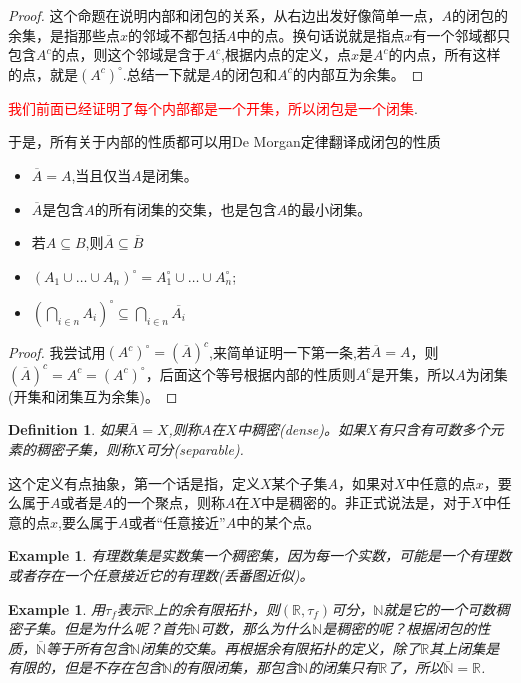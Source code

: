 \documentclass{article}
\newtheorem{example}[theorem]{Example}
\newtheorem{definition}[theorem]{Definition}
\begin{document}
\begin{proof}
这个命题在说明内部和闭包的关系，从右边出发好像简单一点，$A$的闭包的余集，是指那些点$x$的邻域不都包括$A$中的点。换句话说就是指点$x$有一个邻域都只包含$A^c$的点，则这个邻域是含于$A^c$,根据内点的定义，点$x$是$A^c$的内点，所有这样的点，就是$(A^c)^{\circ}$.总结一下就是$A$的闭包和$A^c$的内部互为余集。	
\end{proof}

\textcolor{red}{我们前面已经证明了每个内部都是一个开集，所以闭包是一个闭集}.

于是，所有关于内部的性质都可以用De Morgan定律翻译成闭包的性质

\begin{itemize}
	\item $\overline{A} = A$,当且仅当$A$是闭集。
	\item $\overline{A}$是包含$A$的所有闭集的交集，也是包含$A$的最小闭集。
	\item 若$A \subseteq B$,则$\overline{A} \subseteq \overline{B}$
	\item $(A_1 \cup \ldots \cup A_n)^{\circ}=A_1^{\circ} \cup \ldots \cup A_n^{\circ}$;
	\item ${\left(\bigcap\limits_{i \in n} A_i\right)}^{\circ} \subseteq \bigcap\limits_{i \in n} \overline{A_i}$
\end{itemize}

\begin{proof}
我尝试用$(A^{c})^{\circ}=(\overline{A})^c$,来简单证明一下第一条,若$\overline{A}=A$，则$(\overline{A})^c = A^c=(A^{c})^{\circ}$，后面这个等号根据内部的性质则$A^c$是开集，所以$A$为闭集(开集和闭集互为余集)。
\end{proof}


\begin{definition}
如果$\overline{A}=X$,则称$A$在$X$中稠密(dense)。如果$X$有只含有可数多个元素的稠密子集，则称$X$可分(separable).
\end{definition}

这个定义有点抽象，第一个话是指，定义$X$某个子集$A$，如果对$X$中任意的点$x$，要么属于$A$或者是$A$的一个聚点，则称$A$在$X$中是稠密的。非正式说法是，对于$X$中任意的点$x$,要么属于$A$或者“任意接近”$A$中的某个点。

\begin{example}
有理数集是实数集一个稠密集，因为每一个实数，可能是一个有理数或者存在一个任意接近它的有理数(丢番图近似)。
\end{example}

\begin{example}
用$\tau_f$表示$\mathbb{R}$上的余有限拓扑，则$(\mathbb{R},\tau_f)$可分，$\mathbb{N}$就是它的一个可数稠密子集。但是为什么呢？首先$\mathbb{N}$可数，那么为什么$\mathbb{N}$是稠密的呢？根据闭包的性质，$\overline{\mathbb{N}}$等于所有包含$\mathbb{N}$闭集的交集。再根据余有限拓扑的定义，除了$\mathbb{R}$其上闭集是有限的，但是不存在包含$\mathbb{N}$的有限闭集，那包含$\mathbb{N}$的闭集只有$\mathbb{R}$了，所以$\overline{\mathbb{N}}=\mathbb{R}$.
\end{example}
\end{document}
